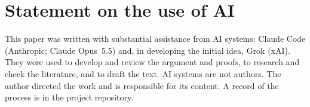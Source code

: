 \section*{Statement on the use of AI}

This paper was written with substantial assistance from AI systems: Claude Code
(Anthropic; Claude Opus~5.5) and, in developing the initial idea, Grok (xAI). They were used to
develop and review the argument and proofs, to research and check the literature, and to draft
the text. AI systems are not authors. The author directed the work and is responsible for its
content. A record of the process is in the project repository.
